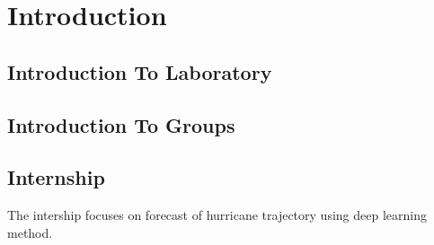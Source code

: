 \chapter{Introduction}
\label{sec:intro}

\section{Introduction To Laboratory}
\label{sec:laboratory}

\section{Introduction To Groups}
\label{groups}

\section{Internship}
\label{sec:subject}
The intership focuses on forecast of hurricane trajectory using deep learning method. 



